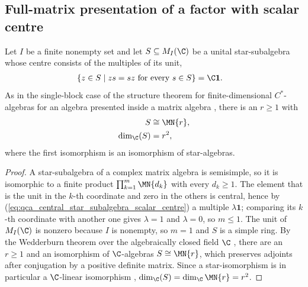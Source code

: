 \subsection{Full-matrix presentation of a factor with scalar centre}

\begin{lemma}
    \label{thm:qca_central_star_subalgebra_matrix}
    \leanok
    Let $I$ be a finite nonempty set and let $S\subseteq M_I(\C)$ be a unital
    star-subalgebra whose centre consists of the multiples of its unit,
    \begin{align}
        \{z\in S\mid zs=sz\text{ for every }s\in S\}
         & =\C\mathbf 1.
        \label{eq:qca_central_star_subalgebra_scalar_centre}
    \end{align}
    As in the single-block case of the structure theorem for
    finite-dimensional $C^*$-algebras
    \cite[Proposition~\texttt{Csform}, lines~2082--2098]{SchumacherWerner2004QCA}
    for an algebra presented inside a matrix algebra
    \cite{gap:sw04_csform_matrix_scope}, there is an $r\geq1$ with
    \begin{align}
        S            & \cong\MN{r}, \notag \\
        \dim_{\C}(S) & =r^2,
    \end{align}
    where the first isomorphism is an isomorphism of star-algebras.
\end{lemma}

\begin{proof}\leanok
    A star-subalgebra of a complex matrix algebra is semisimple, so it is
    isomorphic to a finite product $\prod_{k=1}^{m}\MN{d_k}$ with every
    $d_k\geq1$.  The element that is the unit in the $k$-th coordinate and
    zero in the others is central, hence by
    (\ref{eq:qca_central_star_subalgebra_scalar_centre}) a multiple
    $\lambda\mathbf 1$; comparing its $k$-th coordinate with another one gives
    $\lambda=1$ and $\lambda=0$, so $m\leq1$.  The unit of $M_I(\C)$ is
    nonzero because $I$ is nonempty, so $m=1$ and $S$ is a simple ring.  By the
    Wedderburn theorem over the algebraically closed field $\C$
    \cite[``A $*$-subalgebra with scalar centre is a full matrix
        algebra'']{QICLean2026Blueprint}, there are an $r\geq1$ and an
    isomorphism of $\C$-algebras $S\cong\MN{r}$, which preserves adjoints after
    conjugation by a positive definite matrix.  Since a star-isomorphism is in
    particular a $\C$-linear isomorphism
    \cite[``Dimension of a subalgebra presented as a full matrix
        algebra'']{QICLean2026Blueprint}, $\dim_{\C}(S)=\dim_{\C}\MN{r}=r^2$.
\end{proof}

